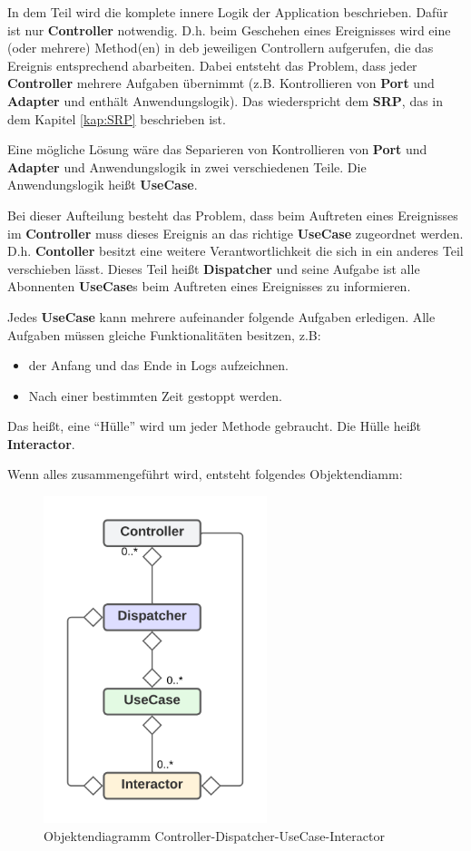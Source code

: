 
In dem Teil wird die komplete innere Logik der Application beschrieben. Dafür ist nur \textbf{Controller} notwendig. 
D.h. beim Geschehen eines Ereignisses wird eine (oder mehrere) Method(en) in deb jeweiligen Controllern aufgerufen,
die das Ereignis entsprechend abarbeiten.
Dabei entsteht das Problem, dass
jeder \textbf{Controller} mehrere Aufgaben übernimmt 
(z.B. Kontrollieren von \textbf{Port} und \textbf{Adapter} und enthält Anwendungslogik).
Das wiederspricht dem \textbf{SRP}, das in dem Kapitel \ref{kap:SRP} beschrieben ist.

Eine mögliche Lösung wäre das Separieren von Kontrollieren von \textbf{Port} und \textbf{Adapter} und Anwendungslogik
in zwei verschiedenen Teile. Die Anwendungslogik heißt \textbf{UseCase}.

Bei dieser Aufteilung besteht das Problem, dass beim Auftreten eines Ereignisses im \textbf{Controller} muss dieses Ereignis an das 
richtige \textbf{UseCase} zugeordnet werden. D.h. \textbf{Contoller} besitzt eine weitere Verantwortlichkeit die sich in ein anderes Teil
verschieben lässt. Dieses Teil heißt \textbf{Dispatcher} und seine Aufgabe ist alle Abonnenten \textbf{UseCase}s
beim Auftreten eines Ereignisses zu informieren.

Jedes \textbf{UseCase} kann mehrere aufeinander folgende Aufgaben erledigen.
Alle Aufgaben müssen gleiche Funktionalitäten besitzen, z.B:
\begin{itemize}
    \item der Anfang und das Ende in Logs aufzeichnen.
    \item Nach einer bestimmten Zeit gestoppt werden.
\end{itemize}
Das heißt, eine ``Hülle'' wird um jeder Methode gebraucht. Die Hülle heißt \textbf{Interactor}.

Wenn alles zusammengeführt wird, entsteht folgendes Objektendiamm:

\begin{figure}[H]
    \centering
    \includegraphics[width=6.5cm]{./images/Controller-Dispatcher-UseCase-Interactor.png}
     \caption[Objektendiagramm Controller-Dispatcher-UseCase-Interactor]{Objektendiagramm Controller-Dispatcher-UseCase-Interactor}
     \label{fig:CDCDUI}
\end{figure}

